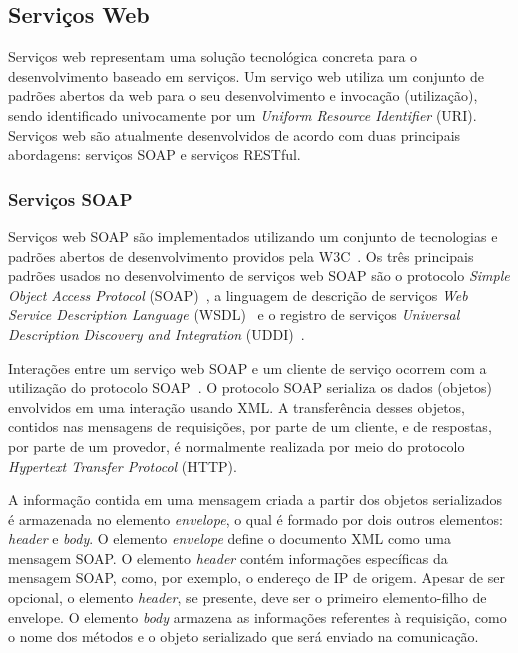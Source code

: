 \subsection{Serviços Web}\label{2-fundamentacao-dbs-servicos-web}

Serviços web representam uma solução tecnológica concreta para o desenvolvimento baseado em serviços. Um serviço web utiliza um conjunto de padrões abertos da web para o seu desenvolvimento e invocação (utilização), sendo identificado univocamente por um \textit{Uniform Resource Identifier} (URI). Serviços web são atualmente desenvolvidos de acordo com duas principais abordagens: serviços SOAP e serviços RESTful.

\subsubsection{Serviços SOAP}\label{2-fundamentacao-dbs-servicos-web-soap}

Serviços web SOAP são implementados utilizando um conjunto de tecnologias e padrões abertos de desenvolvimento providos pela W3C~\cite{DACONTA-OBRST-SMITH-2003-The-Semantic-Web}. Os três principais padrões usados no desenvolvimento de serviços web SOAP são o protocolo \textit{Simple Object Access Protocol} (SOAP)~\cite{W3C-2007-SOAP}, a linguagem de descrição de serviços \textit{Web Service Description Language} (WSDL)~\cite{W3C-2007-WSDL} e o registro de serviços \textit{Universal Description Discovery and Integration} (UDDI)~\cite{OASIS-2004-UDDI}.

Interações entre um serviço web SOAP e um cliente de serviço ocorrem com a utilização do protocolo SOAP~\cite{W3C-2007-SOAP}. O protocolo SOAP serializa os dados (objetos) envolvidos em uma interação usando XML. A transferência desses objetos, contidos nas mensagens de requisições, por parte de um cliente, e de respostas, por parte de um provedor, é normalmente realizada por meio do protocolo \textit{Hypertext Transfer Protocol} (HTTP).

A informação contida em uma mensagem criada a partir dos objetos serializados é armazenada no elemento \textit{envelope}, o qual é formado por dois outros elementos: \textit{header} e \textit{body}. O elemento \textit{envelope} define o documento XML como uma mensagem SOAP. O elemento \textit{header} contém informações específicas da mensagem SOAP, como, por exemplo, o endereço de IP de origem. Apesar de ser opcional, o elemento \textit{header}, se presente, deve ser o primeiro elemento-filho de envelope. O elemento \textit{body} armazena as informações referentes à requisição, como o nome dos métodos e o objeto serializado que será enviado na comunicação.

